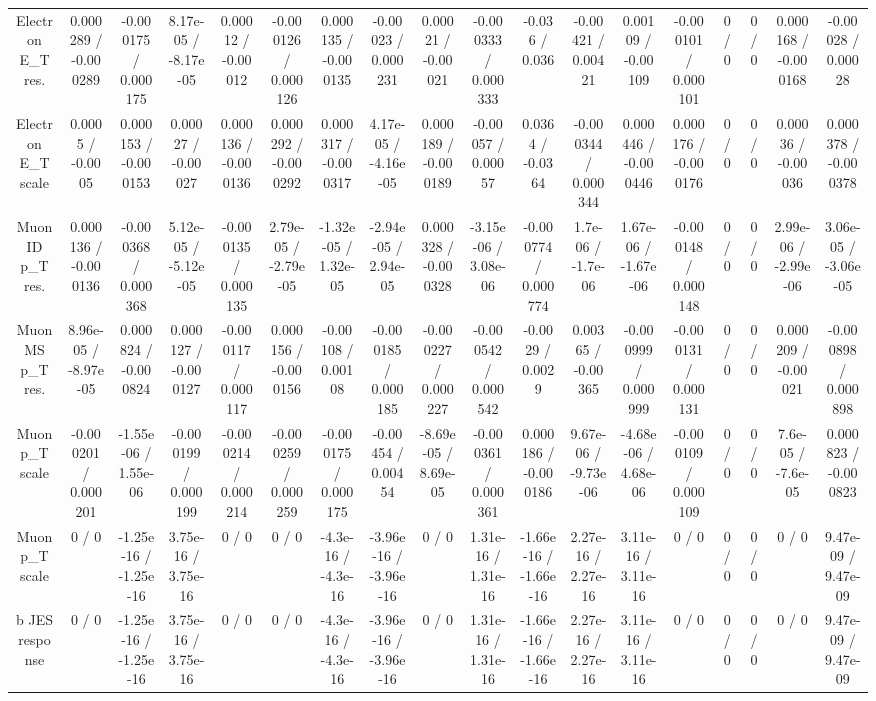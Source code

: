 \documentclass[10pt]{article}
\begin{document}
\begin{table}[htbp]
\begin{center}
\begin{tabular}{|c|c|c|c|c|c|c|c|c|c|c|c|c|c|c|c|c|c|}
  Electron E_{T} res. & 0.000289 / -0.000289 & -0.000175 / 0.000175 & 8.17e-05 / -8.17e-05 & 0.00012 / -0.00012 & -0.000126 / 0.000126 & 0.000135 / -0.000135 & -0.00023 / 0.000231 & 0.00021 / -0.00021 & -0.000333 / 0.000333 & -0.036 / 0.036 & -0.00421 / 0.00421 & 0.00109 / -0.00109 & -0.000101 / 0.000101 & 0 / 0 & 0 / 0 & 0.000168 / -0.000168 & -0.00028 / 0.00028 \\ 
  Electron E_{T} scale & 0.0005 / -0.0005 & 0.000153 / -0.000153 & 0.00027 / -0.00027 & 0.000136 / -0.000136 & 0.000292 / -0.000292 & 0.000317 / -0.000317 & 4.17e-05 / -4.16e-05 & 0.000189 / -0.000189 & -0.00057 / 0.00057 & 0.0364 / -0.0364 & -0.000344 / 0.000344 & 0.000446 / -0.000446 & 0.000176 / -0.000176 & 0 / 0 & 0 / 0 & 0.00036 / -0.00036 & 0.000378 / -0.000378 \\ 
  Muon ID p_{T} res. & 0.000136 / -0.000136 & -0.000368 / 0.000368 & 5.12e-05 / -5.12e-05 & -0.000135 / 0.000135 & 2.79e-05 / -2.79e-05 & -1.32e-05 / 1.32e-05 & -2.94e-05 / 2.94e-05 & 0.000328 / -0.000328 & -3.15e-06 / 3.08e-06 & -0.000774 / 0.000774 & 1.7e-06 / -1.7e-06 & 1.67e-06 / -1.67e-06 & -0.000148 / 0.000148 & 0 / 0 & 0 / 0 & 2.99e-06 / -2.99e-06 & 3.06e-05 / -3.06e-05 \\ 
  Muon MS p_{T} res. & 8.96e-05 / -8.97e-05 & 0.000824 / -0.000824 & 0.000127 / -0.000127 & -0.000117 / 0.000117 & 0.000156 / -0.000156 & -0.00108 / 0.00108 & -0.000185 / 0.000185 & -0.000227 / 0.000227 & -0.000542 / 0.000542 & -0.0029 / 0.0029 & 0.00365 / -0.00365 & -0.000999 / 0.000999 & -0.000131 / 0.000131 & 0 / 0 & 0 / 0 & 0.000209 / -0.00021 & -0.000898 / 0.000898 \\ 
  Muon p_{T} scale & -0.000201 / 0.000201 & -1.55e-06 / 1.55e-06 & -0.000199 / 0.000199 & -0.000214 / 0.000214 & -0.000259 / 0.000259 & -0.000175 / 0.000175 & -0.00454 / 0.00454 & -8.69e-05 / 8.69e-05 & -0.000361 / 0.000361 & 0.000186 / -0.000186 & 9.67e-06 / -9.73e-06 & -4.68e-06 / 4.68e-06 & -0.000109 / 0.000109 & 0 / 0 & 0 / 0 & 7.6e-05 / -7.6e-05 & 0.000823 / -0.000823 \\ 
  Muon p_{T} scale & 0 / 0 & -1.25e-16 / -1.25e-16 & 3.75e-16 / 3.75e-16 & 0 / 0 & 0 / 0 & -4.3e-16 / -4.3e-16 & -3.96e-16 / -3.96e-16 & 0 / 0 & 1.31e-16 / 1.31e-16 & -1.66e-16 / -1.66e-16 & 2.27e-16 / 2.27e-16 & 3.11e-16 / 3.11e-16 & 0 / 0 & 0 / 0 & 0 / 0 & 0 / 0 & 9.47e-09 / 9.47e-09 \\ 
  b JES response & 0 / 0 & -1.25e-16 / -1.25e-16 & 3.75e-16 / 3.75e-16 & 0 / 0 & 0 / 0 & -4.3e-16 / -4.3e-16 & -3.96e-16 / -3.96e-16 & 0 / 0 & 1.31e-16 / 1.31e-16 & -1.66e-16 / -1.66e-16 & 2.27e-16 / 2.27e-16 & 3.11e-16 / 3.11e-16 & 0 / 0 & 0 / 0 & 0 / 0 & 0 / 0 & 9.47e-09 / 9.47e-09 \\ 

\end{tabular}
\end{center}
\end{table}
\end{document}

